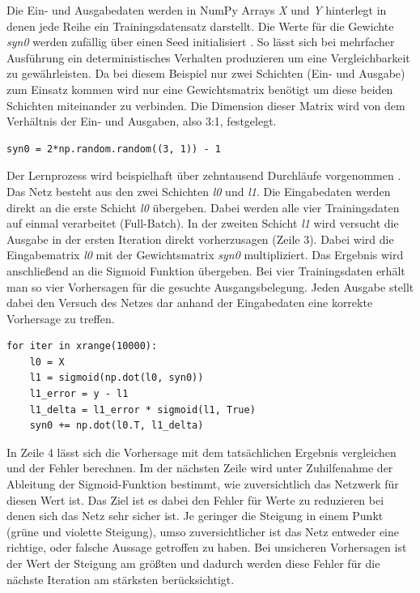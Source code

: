 Die Ein- und Ausgabedaten werden in NumPy Arrays \emph{X} und \emph{Y} hinterlegt in denen jede Reihe ein Trainingsdatensatz darstellt. Die Werte für die Gewichte \emph{syn0} werden zufällig über einen Seed initialisiert . So lässt sich bei mehrfacher Ausführung ein deterministisches Verhalten produzieren um eine Vergleichbarkeit zu gewährleisten. Da bei diesem Beispiel nur zwei Schichten (Ein- und Ausgabe) zum Einsatz kommen wird nur eine Gewichtsmatrix benötigt um diese beiden Schichten miteinander zu verbinden. Die Dimension dieser Matrix wird von dem Verhältnis der Ein- und Ausgaben, also 3:1, festgelegt.

\begin{lstlisting}[caption={Initialisierung Gewichte}, label={initgewicht}]
syn0 = 2*np.random.random((3, 1)) - 1
\end{lstlisting}

Der Lernprozess wird beispielhaft über zehntausend Durchläufe vorgenommen . Das Netz besteht aus den zwei Schichten \emph{l0} und \emph{l1}. Die Eingabedaten werden direkt an die erste Schicht \emph{l0} übergeben. Dabei werden alle vier Trainingsdaten auf einmal verarbeitet (Full-Batch). In der zweiten Schicht \emph{l1} wird versucht die Ausgabe in der ersten Iteration direkt vorherzusagen (Zeile 3). Dabei wird die Eingabematrix \emph{l0} mit der Gewichtsmatrix \emph{syn0} multipliziert. Das Ergebnis wird anschließend an die Sigmoid Funktion übergeben. Bei vier Trainingsdaten erhält man so vier Vorhersagen für die gesuchte Ausgangsbelegung. Jeden Ausgabe stellt dabei den Versuch des Netzes dar anhand der Eingabedaten eine korrekte Vorhersage zu treffen.

\begin{lstlisting}[caption={Lernprozess},label={lernprozess}]
for iter in xrange(10000):
    l0 = X
    l1 = sigmoid(np.dot(l0, syn0))
    l1_error = y - l1
    l1_delta = l1_error * sigmoid(l1, True)
    syn0 += np.dot(l0.T, l1_delta)
\end{lstlisting}    

In Zeile 4 lässt sich die Vorhersage mit dem tatsächlichen Ergebnis vergleichen und der Fehler berechnen. Im der nächsten Zeile wird unter Zuhilfenahme der Ableitung der Sigmoid-Funktion  bestimmt, wie zuversichtlich das Netzwerk für diesen Wert ist. Das Ziel ist es dabei den Fehler für Werte zu reduzieren bei denen sich das Netz sehr sicher ist. Je geringer die Steigung in einem Punkt (grüne und violette Steigung), umso zuversichtlicher ist das Netz entweder eine richtige, oder falsche Aussage getroffen zu haben. Bei unsicheren Vorhersagen ist der Wert der Steigung am größten und dadurch werden diese Fehler für die nächste Iteration am stärksten berücksichtigt.

